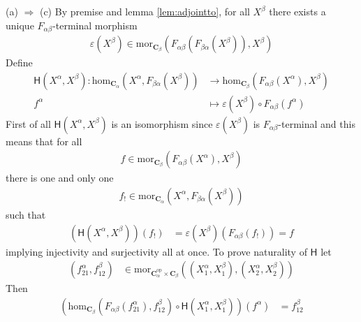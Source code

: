 \begin{prf}
{\glqq}(a) $\Rightarrow$ (c){\grqq}
\qquad
By premise and lemma \ref{lem:adjointto}, for all $X^{\beta}$ there exists a unique $F_{\alpha\beta}$-terminal morphism
\begin{align*}
  \varepsilon(X^{\beta})
  \in
  \mathrm{mor}_{\mathbf{C}_{\beta}}
  \left(
    F_{\alpha\beta}
    \left(
      F_{\beta\alpha}(X^{\beta})
    \right),
    X^{\beta}
  \right)
\end{align*}
Define
\begin{align*}
  \mathsf{H}(X^{\alpha},X^{\beta})
  \colon
  \mathrm{hom}_{\mathbf{C}_{\alpha}}
  \left(
    X^{\alpha},
    F_{\beta\alpha}(X^{\beta})
  \right)
  &\rightarrow
  \mathrm{hom}_{\mathbf{C}_{\beta}}
  \left(
    F_{\alpha\beta}(X^{\alpha}),
    X^{\beta}
  \right)
  \\
  f^{\alpha}
  &\mapsto
  \varepsilon(X^{\beta})
  \circ
  F_{\alpha\beta}(f^{\alpha})
\end{align*}
First of all $\mathsf{H}(X^{\alpha},X^{\beta})$ is an isomorphism since $\varepsilon(X^{\beta})$ is $F_{\alpha\beta}$-terminal and this means that for all
\begin{align*}
  f
  \in
  \mathrm{mor}_{\mathbf{C}_{\beta}}
  \left(
    F_{\alpha\beta}(X^{\alpha}),
    X^{\beta}
  \right)
\end{align*}
there is one and only one
\begin{align*}
  f_{!}
  \in
  \mathrm{mor}_{\mathbf{C}_{\alpha}}
  \left(
    X^{\alpha},
    F_{\beta\alpha}(X^{\beta})
  \right)
\end{align*}
such that
\begin{align*}
  \left(
    \mathsf{H}(X^{\alpha},X^{\beta})
  \right)
  (f_{!})
  &=
  \varepsilon(X^{\beta})
  \left(
    F_{\alpha\beta}(f_{!})
  \right)
  =
  f
\end{align*}
implying injectivity and surjectivity all at once. To prove naturality of $\mathsf{H}$ let
\begin{align*}
  (f_{21}^{\alpha},f_{12}^{\beta})
  &\in
  \mathrm{mor}_{\mathbf{C}_{\alpha}^{\mathrm{op}} \times \mathbf{C}_{\beta}}
  \left(
    (X_{1}^{\alpha},X_{1}^{\beta}),
    (X_{2}^{\alpha},X_{2}^{\beta})
  \right)
\end{align*}
Then
\begin{align*}
  \left(
    \mathrm{hom}_{\mathbf{C}_{\beta}}
    \left(
      F_{\alpha\beta}(f_{21}^{\alpha}),
      f_{12}^{\beta}
    \right)
    \circ
    \mathsf{H}(X_{1}^{\alpha},X_{1}^{\beta})
  \right)
  (f^{\alpha})
  &=
  f_{12}^{\beta}

\end{align*}
\end{prf}
